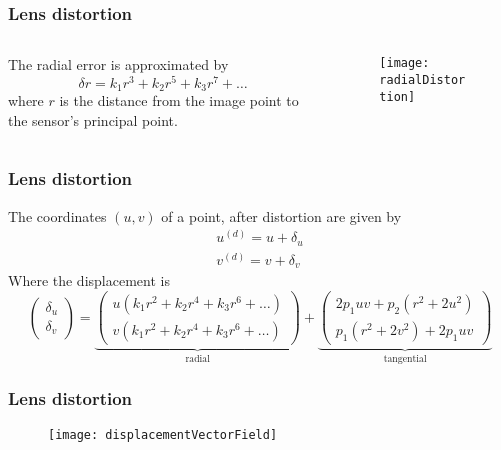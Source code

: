 \begin{frame}
\frametitle{Lens distortion}
\begin{columns}
\begin{column}{.5\textwidth}
The radial error is approximated by
\begin{equation}
\delta r = k_{1} r^{3} + k_{2} r^{5} + k_{3} r^{7} + \ldots
\end{equation}
where $r$ is the distance from the image point to the sensor's principal point.
\end{column}
\begin{column}{.5\textwidth}
\begin{figure}[!h]
\centering
\texttt{[image: radialDistortion]}
\end{figure}
\end{column}
\end{columns}
\end{frame}

\begin{frame}
\frametitle{Lens distortion}
The coordinates $(u,v)$ of a point, after distortion are given by
\begin{equation}
\begin{array}{c}
u^{(d)} = u + \delta_u \\
v^{(d)} = v + \delta	_v
\end{array}
\end{equation}
Where the displacement is
\footnotesize
\begin{equation}
\left (
\begin{array}{c}
\delta_u \\
\delta_v
\end{array}
\right )
=
\underbrace{
\left (
\begin{array}{c}
u \left ( k_{1} r^{2} + k_{2} r^{4} + k_{3} r^{6} + \ldots \right ) \\
v \left ( k_{1} r^{2} + k_{2} r^{4} + k_{3} r^{6} + \ldots \right )
\end{array}
\right )
}_{\text{radial}}
+
\underbrace{
\left (
\begin{array}{c}
2p_{1} uv + p_{2} (r^{2} + 2 u^{2})\\
p_1 ( r^{2} + 2v^{2} ) + 2p_1 uv
\end{array}
\right )
}_{\text{tangential}}
\end{equation}
\end{frame}

\begin{frame}
\frametitle{Lens distortion}
\begin{figure}[!h]
\centering
\texttt{[image: displacementVectorField]}
\end{figure}
\end{frame}

